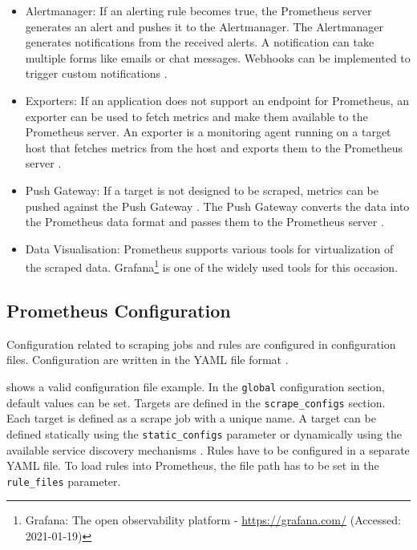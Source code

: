\begin{itemize}
\item Alertmanager:
If an alerting rule becomes true, the Prometheus server generates an alert and pushes it to the Alertmanager. The Alertmanager generates notifications from the received alerts. A notification can take multiple forms like emails or chat messages. Webhooks can be implemented to trigger custom notifications \cite{Bastos2019Prom}.

\item Exporters:
If an application does not support an endpoint for Prometheus, an exporter can be used to fetch metrics and make them available to the Prometheus server. An exporter is a monitoring agent running on a target host that fetches metrics from the host and exports them to the Prometheus server \cite{Pandey2020Monitoring}.

\item Push Gateway:
If a target is not designed to be scraped, metrics can be pushed against the Push Gateway \cite{Prom2020Docs}. The Push Gateway converts the data into the Prometheus data format and passes them to the Prometheus server \cite{Pandey2020Monitoring}.

\item Data Visualisation:
Prometheus supports various tools for virtualization of the scraped data. Grafana\footnote{Grafana: The open observability platform - \url{https://grafana.com/} (Accessed: 2021-01-19)} is one of the widely used tools for this occasion.
\end{itemize}


\subsection{Prometheus Configuration}
Configuration related to scraping jobs and rules are configured in configuration files. Configuration are written in the YAML file format \cite{Prom2020Docs}.


 shows a valid configuration file example.
In the \texttt{global} configuration section, default values can be set.
Targets are defined in the \texttt{scrape\_configs} section. Each target is defined as a scrape job with a unique name.  A target can be defined statically using the \texttt{static\_configs} parameter or dynamically using the available service discovery mechanisms \cite{Prom2020Docs}.
Rules have to be configured in a separate YAML file. To load rules into Prometheus, the file path has to be set in the \texttt{rule\_files} parameter.

